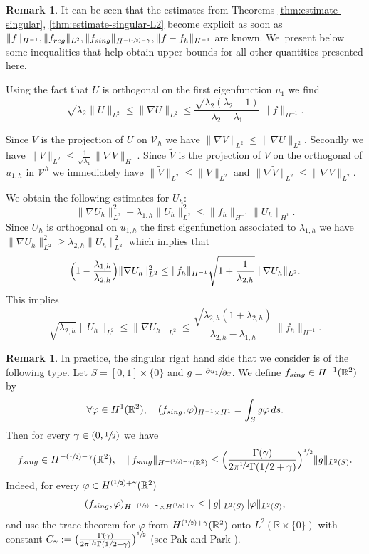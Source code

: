 \documentclass[11pt]{article}
\numberwithin{equation}{section}\newtheorem*{jepEnonce}{\jepEnonceTitle}\newenvironment{enonce*}[1]{\def\jepEnonceTitle{#1}\jepEnonce}{\endjepEnonce}\newtheorem*{conj*}{Conjecture}
\newcommand{\Psfrac}[2]{(\sfrac{#1}{#2})}
\theoremstyle{plain}
\theoremstyle{definition}
\newtheorem{rem}[thm]{Remark}
\newcommand{\reg}{\textup{reg}}
\newcommand{\sing}{\textup{sing}}
\def\R{\mathbb{R}}
\newcommand{\vphi}{\varphi}
\newcommand{\lb}{\lambda}
\let\jepOriginalSfrac\sfrac
\renewcommand{\sfrac}[2]{{\jepOriginalSfrac{#1}{#2}}}
\begin{document}
\begin{rem}
\rm
It can be seen that the estimates from Theorems \ref{thm:estimate-singular}, \ref{thm:estimate-singular-L2} become explicit as soon as $\|f\|_{H^{-1}}, \|f_{\reg}\|_{L^2}, \|f_{\sing}\|_{H^{-\Psfrac{1}{2}-\gamma}}, \|f-f_h\|_{H^{-1}}$ are known. We~present below some inequalities that help obtain upper bounds for all other quantities presented here.

Using the fact that $U$ is orthogonal on the first eigenfunction $u_1$ we find
\[
\sqrt{\lambda_2}\|U\|_{L^2}\le \|\nabla U\|_{L^2}\le \frac{\sqrt{\lb_2(\lb_2+1)}}{\lb_2-\lb_1}\,\|f\|_{H^{-1}}.
\]

Since $V$ is the projection of $U$ on $\mathcal V_h$ we have $\|\nabla V\|_{L^2} \leq \|\nabla U\|_{L^2}$. Secondly we have $\|V\|_{L^2} \leq \frac{1}{\sqrt{\lambda_1}} \|\nabla V\|_{H^1}$. Since $\tilde V$ is the projection of $V$ on the orthogonal of $u_{1,h}$ in $\mathcal V^h$ we immediately have $\|\tilde V\|_{L^2} \leq \|V\|_{L^2}$ and $\|\nabla \tilde V\|_{L^2} \leq \|\nabla V\|_{L^2}$.

We obtain the following estimates for $U_h$:
\[
\|\nabla U_h\|^2_{L^2}-\lambda_{1,h} \|U_h\|_{L^2}^2 \leq \|f_h\|_{H^{-1}}\|U_h\|_{H^1}.
\]
Since $U_h$ is orthogonal on $u_{1,h}$ the first eigenfunction associated to $\lambda_{1,h}$ we have $\|\nabla U_h\|_{L^2}^2 \geq \lambda_{2,h} \|U_h\|_{L^2}^2$ which implies that
\[
\Bigl(1-\frac{\lambda_{1,h}}{\lambda_{2,h}}\Bigr) \|\nabla U_h\|^2_{L^2} \leq \|f_h\|_{H^{-1}} \sqrt{1+\frac{1}{\lambda_{2,h}}}\; \|\nabla U_h\|_{L^2}.
\]
This implies
\[
\sqrt{\lambda_{2,h}}\|U_h\|_{L^2} \leq \|\nabla U_h\|_{L^2} \leq \frac{\sqrt{\lambda_{2,h}(1+\lambda_{2,h})}}{\lambda_{2,h}-\lambda_{1,h}}\, \|f_h\|_{H^{-1}}.
\]
\label{rem:needed-estimates}
\end{rem}

\begin{rem}
In practice, the singular right hand side that we consider is of the following type. Let $S= [0, 1]\times \{0\}$ and $g= \sfrac{\partial u_1}{\partial x} $. We define $f_{\sing}\in H^{-1}(\R^2)$ by
\[
\forall \vphi \in H^1(\R^2),\quad (f _{\sing}, \vphi)_{H^{-1}\times H^1} = \int_S g \vphi\, ds.
\]
Then for every $\gamma \in (0, \sfrac 12)$ we have
\[
f_{\sing} \in H^{-\Psfrac 12 -\gamma} (\R^2), \quad \|f_{\sing}\|_{H^{-\Psfrac 12 -\gamma} (\R^2)} \le
\Bigl (\frac{\Gamma(\gamma)}{2\pi^{\sfrac 12} \Gamma(1/2+\gamma)}\Bigr)^{\sfrac 12} \|g\|_{L^2(S)}.
\]
Indeed, for every $\vphi\in H^{\Psfrac 12 +\gamma} (\R^2)$
\[
(f_{\sing}, \vphi)_{H^{-\Psfrac 12-\gamma}\times H^{\Psfrac 12 +\gamma}}\le \|g\|_{L^2(S)} \|\vphi\|_{L^2(S)},
\]
and use the trace theorem for $\vphi$ from
$H^{\Psfrac 12 +\gamma} (\R^2)$ onto $L^2(\R\times\{0\})$ with constant $C_\gamma := \big (\frac{\Gamma(\gamma)}{2\pi^{\sfrac 12} \Gamma(1/2+\gamma)}\big)^{\sfrac 12}$ (see Pak and Park \cite{PaPa11}).
\label{rem:c-gamma}
\end{rem}
\end{document}
